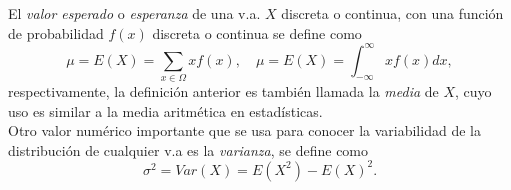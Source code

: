 El \emph{valor esperado} o \emph{esperanza} de una v.a. $X$ discreta o continua, con una función de probabilidad $f(x)$  discreta o continua se define como
\begin{equation}
	\mu=E(X)=\sum_{x\in \Omega}xf(x),
	\quad
	\mu=E(X)=\int_{-\infty}^{\infty}xf(x)dx,
\end{equation}
respectivamente, la definición anterior  es también llamada la \emph{media} de $X$, cuyo uso es  similar a la media aritmética en estadísticas.\\



\noindent Otro valor numérico importante que se usa para conocer la variabilidad de la distribución de cualquier v.a es la  \emph{varianza},  se define como
\begin{equation}
	\sigma^2=Var(X)=E(X^2)-E(X)^2.
\end{equation}

